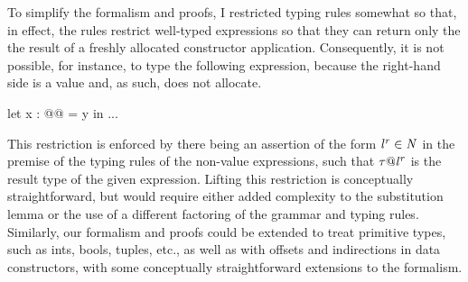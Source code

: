 To simplify the formalism and proofs, I restricted typing rules
somewhat so that, in effect, the rules restrict well-typed expressions
so that they can return only the the result of a freshly allocated
constructor application.
%
Consequently, it is not possible, for instance, to type the following
expression, because the right-hand side is a value and, as such, does
not allocate.
%
\begin{code}
let x : @@ = y in ...
\end{code}
%
This restriction is enforced by there being an assertion of the form
${\mathit{l}}^{\mathit{r}} \in \mathit{N}$ in the premise of the typing rules of
the non-value expressions, such that $\mathit{\tau} @ {\mathit{l}}^{\mathit{r}}$
is the result type of the given expression.
%
Lifting this restriction is conceptually straightforward, but would
require either added complexity to the substitution lemma or the use
of a different factoring of the grammar and typing rules.
%
Similarly, our formalism and proofs could be extended to treat
primitive types, such as ints, bools, tuples, etc., as well as with
offsets and indirections in data constructors, with some conceptually
straightforward extensions to the formalism.



